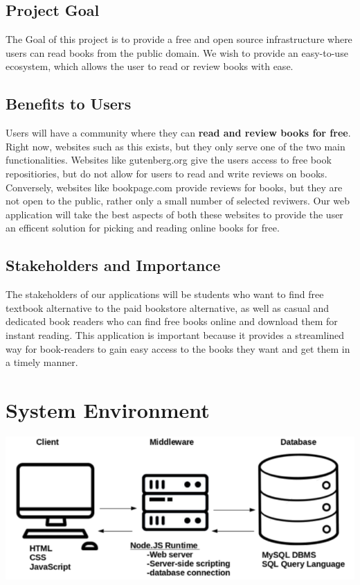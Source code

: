 \documentclass[letter, 12pt, titlepage]{article}
\begin{document}
	\subsection{Project Goal}
	The Goal of this project is to provide a free and open source infrastructure where users can read books from the public domain. We wish to provide an easy-to-use ecosystem, which allows the user to read or review books with ease.
	\subsection{Benefits to Users}
	Users will have a community where they can \textbf{read and review books for free}. Right now, websites such as this exists, but they only serve one of the two main functionalities. Websites like gutenberg.org give the users access to free book repositiories, but do not allow for users to read and write reviews on books. Conversely, websites like bookpage.com provide reviews for books, but they are not open to the public, rather only a small number of selected reviwers. Our web application will take the best aspects of both these websites to provide the user an efficent solution for picking and reading online books for free.
    \subsection{Stakeholders and Importance}
    The stakeholders of our applications will be students who want to find free textbook alternative to the paid bookstore alternative, as well as casual and dedicated book readers who can find free books online and download them for instant reading. This application is important because it provides a streamlined way for book-readers to gain easy access to the books they want and get them in a timely manner.


	\section{System Environment}
	
			\includegraphics[scale=.66]{3-tier.png}
\end{document}
